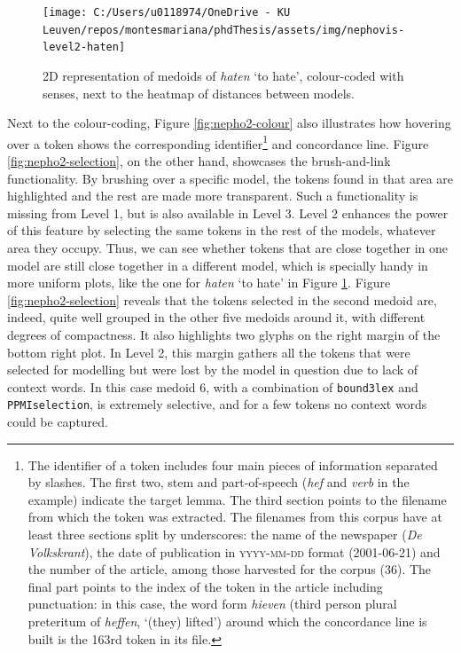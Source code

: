 \documentclass[
]{book}
\begin{document}
\begin{figure}
\texttt{[image: C:/Users/u0118974/OneDrive - KU Leuven/repos/montesmariana/phdThesis/assets/img/nephovis-level2-haten]} \caption{2D representation of medoids of \emph{haten} `to hate', colour-coded with senses, next to the heatmap of distances between models.}\label{fig:nepho2-haten}
\end{figure}

Next to the colour-coding, Figure \ref{fig:nepho2-colour} also illustrates how hovering over a token shows the corresponding identifier\footnote{The identifier of a token includes four main pieces of information separated by slashes. The first two, stem and part-of-speech (\emph{hef} and \emph{verb} in the example) indicate the target lemma. The third section points to the filename from which the token was extracted. The filenames from this corpus have at least three sections split by underscores: the name of the newspaper (\emph{De Volkskrant}), the date of publication in \textsc{yyyy-mm-dd} format (2001-06-21) and the number of the article, among those harvested for the corpus (36). The final part points to the index of the token in the article including punctuation: in this case, the word form \emph{hieven} (third person plural preteritum of \emph{heffen}, `(they) lifted') around which the concordance line is built is the 163rd token in its file.} and concordance line. Figure \ref{fig:nepho2-selection}, on the other hand, showcases the brush-and-link functionality. By brushing over a specific model, the tokens found in that area are highlighted and the rest are made more transparent. Such a functionality is missing from Level 1, but is also available in Level 3. Level 2 enhances the power of this feature by selecting the same tokens in the rest of the models, whatever area they occupy. Thus, we can see whether tokens that are close together in one model are still close together in a different model, which is specially handy in more uniform plots, like the one for \emph{haten} `to hate' in Figure \ref{fig:nepho2-haten}. Figure \ref{fig:nepho2-selection} reveals that the tokens selected in the second medoid are, indeed, quite well grouped in the other five medoids around it, with different degrees of compactness. It also highlights two glyphs on the right margin of the bottom right plot. In Level 2, this margin gathers all the tokens that were selected for modelling but were lost by the model in question due to lack of context words. In this case medoid 6, with a combination of \texttt{bound3lex} and \texttt{PPMIselection}, is extremely selective, and for a few tokens no context words could be captured.
\end{document}
